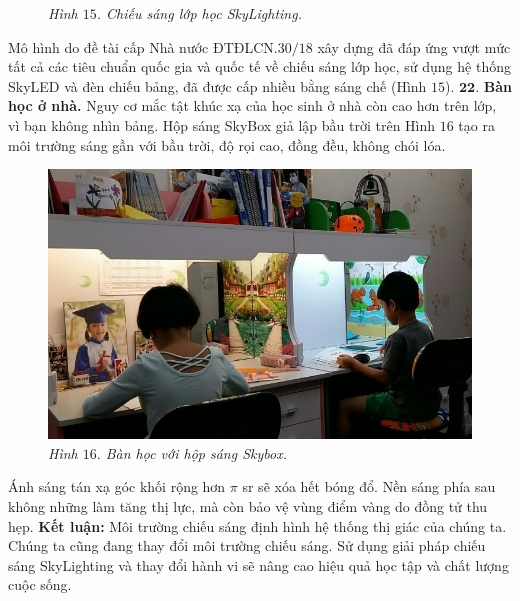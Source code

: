\begin{multicols}{2}
\begin{figure}[H]
		\caption{\small\textit{\color{timhieukhoahoc}Hình $15$. Chiếu sáng lớp học SkyLighting.}}
		\vspace*{-10pt}
	\end{figure}
	Mô hình do đề tài cấp Nhà nước ĐTĐLCN.$30/18$ xây dựng đã đáp ứng vượt mức tất cả các tiêu chuẩn quốc gia và quốc tế về chiếu sáng lớp học, sử dụng hệ thống SkyLED và đèn chiếu bảng, đã được cấp nhiều bằng sáng chế (Hình $15$).
	\vskip 0.1cm
	$\pmb{22.}$ \textbf{\color{timhieukhoahoc}Bàn học ở nhà.}
	\vskip 0.1cm
	Nguy cơ mắc tật khúc xạ của học sinh ở nhà còn cao hơn trên lớp, vì bạn không nhìn bảng. Hộp sáng SkyBox giả lập bầu trời trên Hình $16$ tạo ra môi trường sáng gần với bầu trời, độ rọi cao, đồng đều, không chói lóa. 
	\begin{figure}[H]
		\vspace*{-5pt}
		\centering
		\captionsetup{labelformat= empty, justification=centering}
		\includegraphics[width= 1\linewidth]{16}
		\caption{\small\textit{\color{timhieukhoahoc}Hình $16.$ Bàn học với hộp sáng Skybox.}}
		\vspace*{-5pt}
	\end{figure}
	Ánh sáng tán xạ góc khối rộng hơn $\pi$ sr sẽ xóa hết bóng đổ. Nền sáng phía sau không những làm tăng thị lực, mà còn bảo vệ vùng điểm vàng do đồng tử thu hẹp. 
	\vskip 0.1cm
	\textbf{\color{timhieukhoahoc}Kết luận:}
	\vskip 0.1cm
	Môi trường chiếu sáng định hình hệ thống thị giác của chúng ta. Chúng ta cũng đang thay đổi môi trường chiếu sáng. Sử dụng giải pháp chiếu sáng SkyLighting và thay đổi hành vi sẽ nâng cao hiệu quả học tập và chất lượng cuộc sống. 
\end{multicols}



